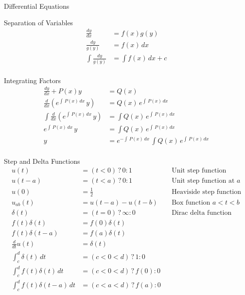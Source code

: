 %
%

\begin{section}{Differential Equations}
  \begin{subsection}{Separation of Variables}
    \begin{align*}
      \frac{dy}{dx} &= f(x)g(y) \\
      \frac{dy}{g(y)} &= f(x)\,dx \\
      \int{\frac{dy}{g(y)}} &= \int{f(x)}\,dx+c \\
    \end{align*}
  \end{subsection}
  \begin{subsection}{Integrating Factors}
    \begin{align*}
      \frac{dy}{dx} + P(x)y &= Q(x) \\
      \frac{d}{dx}(e^{\int\,P(x)\,dx}\,y) &= Q(x)\,e^{\int\,P(x)\,dx} \\
      \int{\frac{d}{dx}(e^{\int\,P(x)\,dx}\,y)} &= \int{Q(x)\,e^{\int\,P(x)\,dx}} \\
      e^{\int\,P(x)\,dx}\,y &= \int{Q(x)\,e^{\int\,P(x)\,dx}} \\
      y &= e^{-\int\,P(x)\,dx}\,\int{Q(x)\,e^{\int\,P(x)\,dx}} \\
    \end{align*}
  \end{subsection}
  \begin{subsection}{Step and Delta Functions}
    \begin{align*}
      u(t) &= (t<0) \,?\, 0 : 1 && \text{Unit step function}\\
      u(t-a) &= (t<a) \,?\, 0 : 1 && \text{Unit step function at $a$}\\
      u(0) &= \frac{1}{2} && \text{Heaviside step function}\\
      u_{ab}(t) &= u(t-a) - u(t-b) && \text{Box function $a<t<b$}\\
      \delta(t) &= (t=0)\,?\,\infty : 0 && \text{Dirac delta function}\\
      f(t)\delta(t) &= f(0)\delta(t) \\
      f(t)\delta(t-a) &= f(a)\delta(t) \\
      \frac{d}{dt}u(t) &= \delta(t)\\
      \int_c^d \delta(t)\,dt &= (c<0<d)\,?\,1:0 \\
      \int_c^d f(t)\delta(t)\,dt &= (c<0<d)\,?\,f(0):0 \\
      \int_c^d f(t)\delta(t-a)\,dt &= (c<a<d)\,?\,f(a):0 \\

\end{align*}
\end{subsection}
\end{section}
